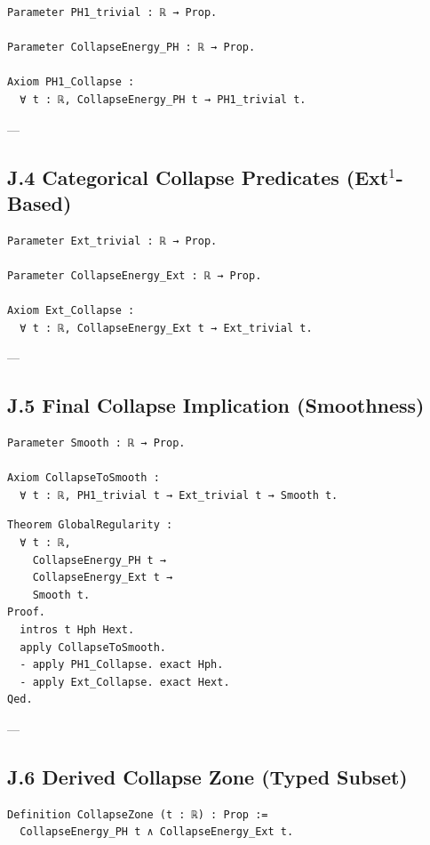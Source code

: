 \documentclass[11pt]{article}
\begin{document}
\begin{lstlisting}[language=Coq]
Parameter PH1_trivial : ℝ → Prop.

Parameter CollapseEnergy_PH : ℝ → Prop.

Axiom PH1_Collapse :
  ∀ t : ℝ, CollapseEnergy_PH t → PH1_trivial t.
\end{lstlisting}

---

\subsection*{J.4 Categorical Collapse Predicates (Ext$^1$-Based)}

\begin{lstlisting}[language=Coq]
Parameter Ext_trivial : ℝ → Prop.

Parameter CollapseEnergy_Ext : ℝ → Prop.

Axiom Ext_Collapse :
  ∀ t : ℝ, CollapseEnergy_Ext t → Ext_trivial t.
\end{lstlisting}

---

\subsection*{J.5 Final Collapse Implication (Smoothness)}

\begin{lstlisting}[language=Coq]
Parameter Smooth : ℝ → Prop.

Axiom CollapseToSmooth :
  ∀ t : ℝ, PH1_trivial t → Ext_trivial t → Smooth t.
\end{lstlisting}

\begin{lstlisting}[language=Coq]
Theorem GlobalRegularity :
  ∀ t : ℝ,
    CollapseEnergy_PH t →
    CollapseEnergy_Ext t →
    Smooth t.
Proof.
  intros t Hph Hext.
  apply CollapseToSmooth.
  - apply PH1_Collapse. exact Hph.
  - apply Ext_Collapse. exact Hext.
Qed.
\end{lstlisting}

---

\subsection*{J.6 Derived Collapse Zone (Typed Subset)}

\begin{lstlisting}[language=Coq]
Definition CollapseZone (t : ℝ) : Prop :=
  CollapseEnergy_PH t ∧ CollapseEnergy_Ext t.
\end{lstlisting}
\end{document}
